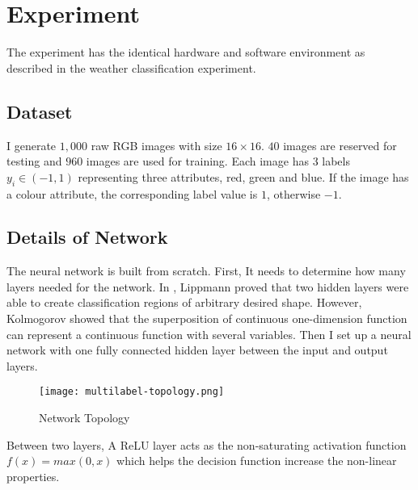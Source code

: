
\chapter{Experiment} %
\label{Chapter8}

The experiment has the identical hardware and software environment as described in the weather classification experiment.

\section{Dataset}

I generate $1,000$ raw RGB images with size $16 \times 16$. $40$ images are reserved for testing and $960$ images are used for training. Each image has $3$ labels $y_i \in (-1, 1)$ representing three attributes, red, green and blue. If the image has a colour attribute, the corresponding label value is $1$, otherwise $-1$.

\section{Details of Network}

The neural network is built from scratch. First, It needs to determine how many layers needed for the network. In \cite{lippmann1987introduction}, Lippmann proved that two hidden layers were able to create classification regions of arbitrary desired shape. However, Kolmogorov \citep{kolmogorov1963representation} showed that the superposition of continuous one-dimension function can represent a continuous function with several variables. Then I set up a neural network with one fully connected hidden layer between the input and output layers.
\begin{figure}[!htb]
\centering
\texttt{[image: multilabel-topology.png]}
\caption{\label{fig:MLtopology}Network Topology}
\end{figure}
Between two layers, A ReLU layer acts as the non-saturating activation function $f(x) = max(0,x)$ which helps the decision function increase the non-linear properties.

